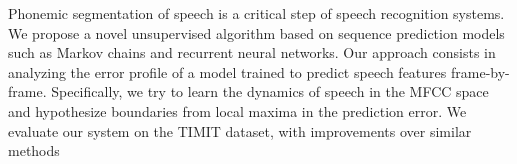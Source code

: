 Phonemic segmentation of speech is a critical step of speech recognition systems. We propose a novel unsupervised algorithm based on sequence prediction models such as Markov chains and recurrent neural networks. Our approach consists in analyzing the error profile of a model trained to predict speech features frame-by-frame. Specifically, we try to learn the dynamics of speech in the MFCC space and hypothesize boundaries from local maxima in the prediction error. We evaluate our system on the TIMIT dataset, with improvements over similar methods
